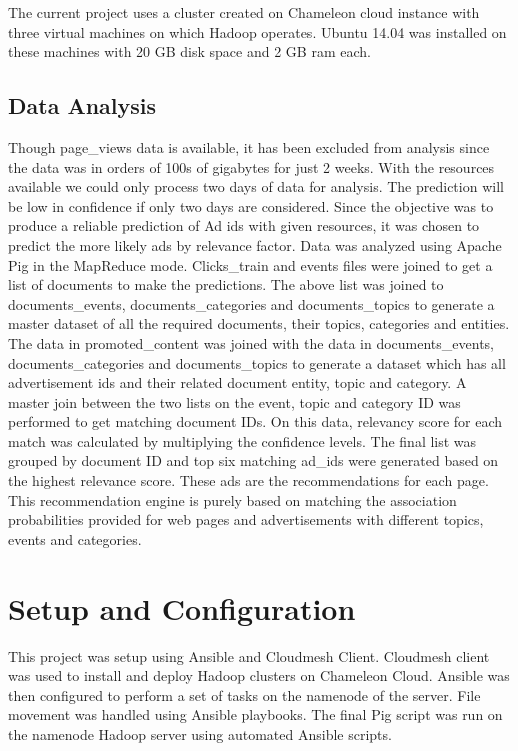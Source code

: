 \documentclass[9pt,twocolumn,twoside]{../../styles/osajnl}
\begin{document}
The current project uses a cluster created on Chameleon cloud instance with three virtual machines on which Hadoop operates. Ubuntu 14.04 was installed on these machines with 20 GB disk space and 2 GB ram each.

\subsection{Data Analysis}
Though page\_views data is available, it has been excluded from analysis since the data was in orders of 100s of gigabytes for just 2 weeks. With the resources available we could only process two days of data for analysis. The prediction will be low in confidence if only two days are considered. Since the objective was to produce a reliable prediction of Ad ids with given resources, it was chosen to predict the more likely ads by relevance factor. Data was analyzed using Apache Pig in the MapReduce mode. Clicks\_train and events files were joined to get a list of documents to make the predictions. The above list was joined to documents\_events, documents\_categories and documents\_topics to generate a master dataset of all the required documents, their topics, categories and entities. The data in promoted\_content was joined with the data in documents\_events, documents\_categories and documents\_topics to generate a dataset which has all advertisement ids and their related document entity, topic and category. A master join between the two lists on the event, topic and category ID was performed to get matching document IDs. On this data, relevancy score for each match was calculated by multiplying the confidence levels. The final list was grouped by document ID and top six matching ad\_ids were generated based on the highest relevance score. These ads are the recommendations for each page. This recommendation engine is purely based on matching the association probabilities provided for web pages and advertisements with different topics, events and categories.

\section{Setup and Configuration}
This project was setup using Ansible and Cloudmesh Client. Cloudmesh client was used to install and deploy Hadoop clusters on Chameleon Cloud. Ansible was then configured to perform a set of tasks on the namenode of the server. File movement was handled using Ansible playbooks. The final Pig script was run on the namenode Hadoop server using automated Ansible scripts.
\end{document}
